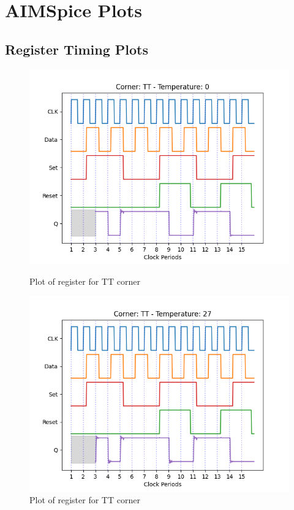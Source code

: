 \newpage
\section{AIMSpice Plots}
\label{appendix:aimspicePlots}

\subsection{Register Timing Plots}
\label{appendix:register_plots}

\begin{figure}[H]
    \begin{minipage}{0.5\textwidth}
        \centering
        \includegraphics[width=\textwidth]{Figures/Aimspice_Plots/TT_0.png}
        \caption{Plot of register for TT corner}
        \label{fig:TT0}
    \end{minipage}%
    \begin{minipage}{0.5\textwidth}
        \centering
        \includegraphics[width=\textwidth]{Figures/Aimspice_Plots/TT_27.png}
        \caption{Plot of register for TT corner}
        \label{fig:TT27}
    \end{minipage}
\end{figure}
